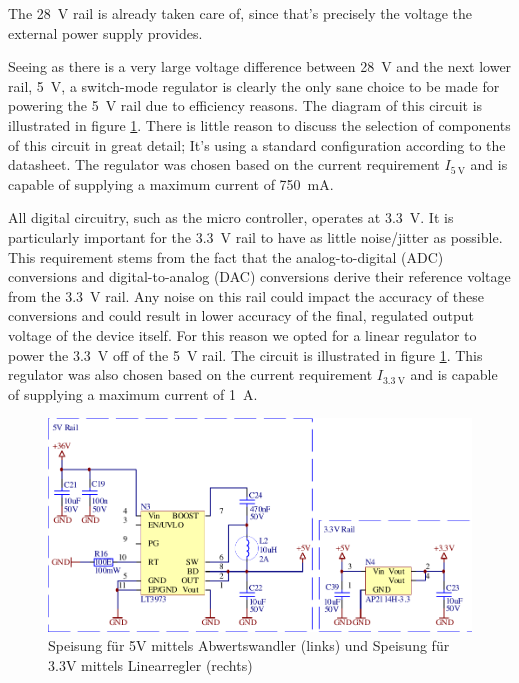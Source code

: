 The \SI{28}{\volt}  rail  is  already  taken care of, since that's precisely the
voltage the external power supply provides.

Seeing as  there  is  a very large voltage difference between \SI{28}{\volt} and
the next lower rail, \SI{5}{\volt}, a switch-mode regulator is clearly  the only
sane choice to be made for powering  the  \SI{5}{\volt}  rail  due to efficiency
reasons.   The    diagram   of   this   circuit   is   illustrated   in   figure
\ref{fig:circuit:rails}. There is little reason  to  discuss  the  selection  of
components of  this circuit in great detail; It's using a standard configuration
according  to  the  datasheet.  The  regulator  was  chosen based on the current
requirement $I_{\SI{5}{\volt}}$ and is capable of supplying a maximum current of
\SI{750}{\milli\ampere}.

All   digital   circuitry,  such  as   the   micro   controller,   operates   at
\SI{3.3}{\volt}. It is particularly important for the  \SI{3.3}{\volt}  rail  to
have as  little  noise/jitter  as possible. This requirement stems from the fact
that  the  analog-to-digital  (ADC)  conversions  and  digital-to-analog   (DAC)
conversions derive their  reference  voltage  from the \SI{3.3}{\volt} rail. Any
noise on  this  rail  could  impact  the accuracy of these conversions and could
result in lower accuracy of the final,  regulated  output  voltage of the device
itself.  For  this  reason  we  opted  for  a  linear  regulator  to  power  the
\SI{3.3}{\volt} off of the \SI{5}{\volt} rail.  The  circuit  is  illustrated in
figure  \ref{fig:circuit:rails}.  This regulator was also chosen  based  on  the
current requirement $I_{\SI{3.3}{\volt}}$ and is capable of  supplying a maximum
current of \SI{1}{\ampere}.

\begin{figure}[th!]
    \center
    \includegraphics[width=.75\textwidth]{images/circuit/5v-3v-rails.pdf}
    \caption{Speisung f\"ur 5V mittels Abwertswandler (links) und Speisung f\"ur 3.3V mittels Linearregler (rechts)}
    \label{fig:circuit:rails}
\end{figure}

